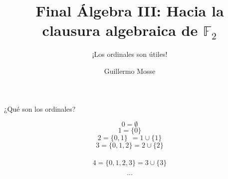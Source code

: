 \documentclass[10pt,spanish]{beamer}
\def\key#1{\{#1\}}
\def\F{\mathbb{F}}
\begin{document}
\title{Final Álgebra III: Hacia la clausura algebraica de $\F_2$}
\subtitle{\tiny{¡Los ordinales son útiles!}}
\date{}
\author{Guillermo Mosse}

\maketitle











\begin{frame}{¿Qué son los ordinales?}


$$ 0 = \emptyset $$ \pause
$$ 1 = \key{0}$$ \pause
$$ 2 = \key{0,1}\ \ = 1 \cup \key{1} $$\pause
$$ 3 = \key{0,1,2} = 2 \cup \key{2}$$\\
$$ 4 = \key{0,1,2,3} = 3 \cup \key{3}$$

$$...$$

\end{frame}
\end{document}
